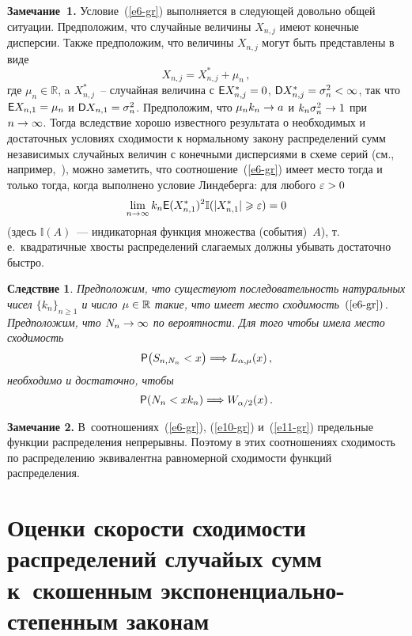 \begin{multicols}{2}
\smallskip

\noindent
\textbf{Замечание~1.} Условие~(\ref{e6-gr}) выполняется в следующей довольно
общей ситуации. Предположим, что случайные величины $X_{n,j}$ имеют
конечные дисперсии. Также предположим, что величины $X_{n,j}$ могут
быть представлены в виде
$$
X_{n,j}=X_{n,j}^*+\mu_n\,,
$$
где $\mu_n\in\mathbb{R}$, a $X_{n,j}^*$~-- случайная величина с
${\sf E} X_{n,j}^*\hm=0$, ${\sf D} X_{n,j}^*\hm=\sigma_n^2\hm<\infty$, так
что ${\sf E} X_{n,1}\hm=\mu_n$ и ${\sf D} X_{n,1}\hm=\sigma_n^2$.
Предположим, что $\mu_nk_n\hm\to a$ и $k_n\sigma_n^2\hm\to 1$ при
$n\hm\to\infty$. Тогда вследствие хорошо известного результата о
необходимых и достаточных условиях сходимости к нормальному закону
распределений сумм независимых случайных величин с конечными
дисперсиями в схеме серий (см., например,~\cite{GnedenkoKolmogorov1949}), 
можно заметить, что соотношение~(\ref{e6-gr})
имеет место тогда и только тогда, когда выполнено условие
Линдеберга: для любого $\varepsilon\hm>0$
$$
\lim_{n\to\infty}k_n{\sf E}(X_{n,1}^*)^2\mathbb{I}(|X_{n,1}^*|\geqslant\varepsilon)=0
$$
(здесь $\mathbb{I}(A)$~--- индикаторная функция множества (события)~$A$), 
т.\,е.\ квадратичные хвосты распределений слагаемых должны убывать достаточно \mbox{быстро}.

\smallskip

\noindent
\textbf{Следствие 1}. \textit{Предположим, что существуют последовательность 
натуральных чисел $\{k_n\}_{n\geqslant1}$ и число $\mu\hm\in\mathbb{R}$ такие, что 
имеет место сходимость~$(\ref{e6-gr})$. Предположим, что $N_n\hm\to\infty$ по вероятности. 
Для того чтобы имела место сходимость}
\begin{equation}
{\sf P}\big(S_{n,N_n}<x\big)\Longrightarrow
L_{\alpha,\mu}(x)\,,\label{e10-gr}
\end{equation}
\textit{необходимо и достаточно, чтобы}
\begin{equation}
{\sf P}(N_n<xk_n)\Longrightarrow W_{\alpha/2}(x)\,.\label{e11-gr}
\end{equation}

\smallskip

\noindent
\textbf{Замечание 2.} В~соотношениях~(\ref{e6-gr}), (\ref{e10-gr}) и~(\ref{e11-gr}) пре\-дельные
функции распределения непрерывны. По\-этому в этих соотношениях
сходимость по распределению эквивалентна равномерной сходи\-мости \mbox{функций} распределения.

\section{{Оценки скорости сходимости распределений случайых 
сумм к~скошенным экспоненциально-степенным законам}}


\end{multicols}
